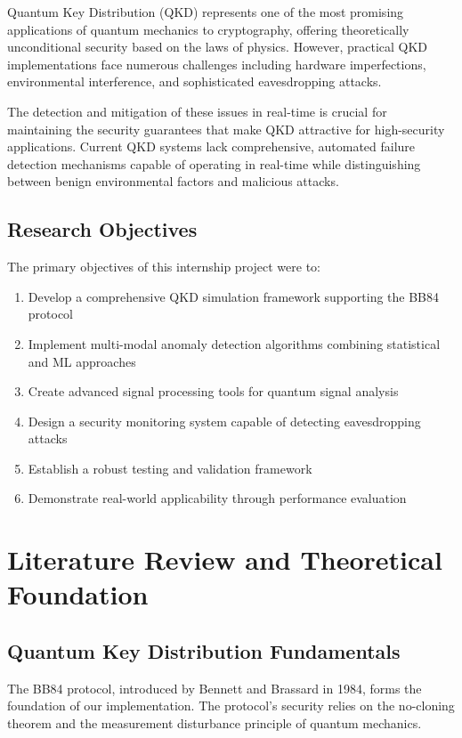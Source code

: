 \documentclass[12pt,a4paper]{article}
\begin{document}
Quantum Key Distribution (QKD) represents one of the most promising applications of quantum mechanics to cryptography, offering theoretically unconditional security based on the laws of physics. However, practical QKD implementations face numerous challenges including hardware imperfections, environmental interference, and sophisticated eavesdropping attacks.

The detection and mitigation of these issues in real-time is crucial for maintaining the security guarantees that make QKD attractive for high-security applications. Current QKD systems lack comprehensive, automated failure detection mechanisms capable of operating in real-time while distinguishing between benign environmental factors and malicious attacks.

\subsection{Research Objectives}

The primary objectives of this internship project were to:

\begin{enumerate}
    \item Develop a comprehensive QKD simulation framework supporting the BB84 protocol
    \item Implement multi-modal anomaly detection algorithms combining statistical and ML approaches
    \item Create advanced signal processing tools for quantum signal analysis
    \item Design a security monitoring system capable of detecting eavesdropping attacks
    \item Establish a robust testing and validation framework
    \item Demonstrate real-world applicability through performance evaluation
\end{enumerate}

\section{Literature Review and Theoretical Foundation}

\subsection{Quantum Key Distribution Fundamentals}

The BB84 protocol, introduced by Bennett and Brassard in 1984, forms the foundation of our implementation. The protocol's security relies on the no-cloning theorem and the measurement disturbance principle of quantum mechanics.
\end{document}
